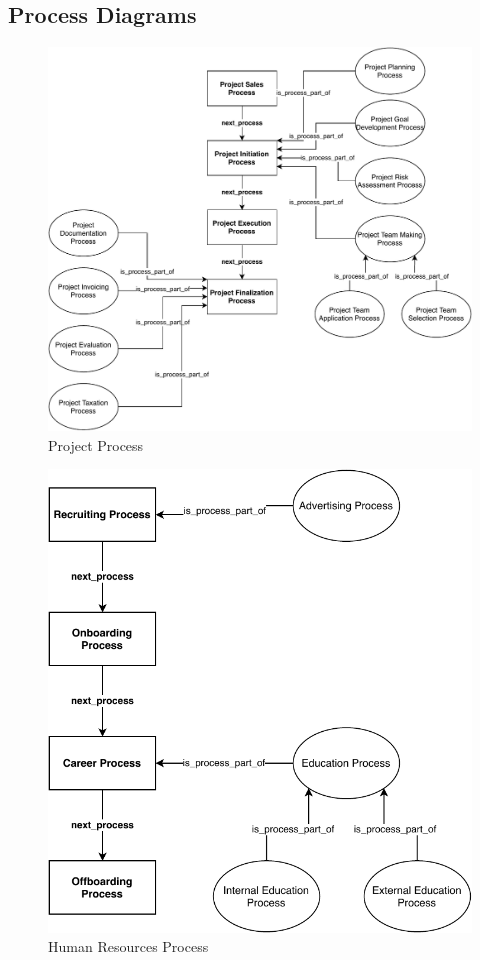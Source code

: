 \documentclass[a4paper, DIV=13, BCOR=0cm]{scrbook}
\begin{document}
\subsection{Process Diagrams}
\label{process-diagrams}
\begin{figure}[h]
	\caption{Project Process}
	\centering
	\includegraphics[width=1\textwidth]{Diagrams/project-process.pdf}
\end{figure}

\begin{figure}[h]
	\caption{Human Resources Process}
	\centering
	\includegraphics[width=1\textwidth]{Diagrams/hr-process.pdf}
\end{figure}
\end{document}

